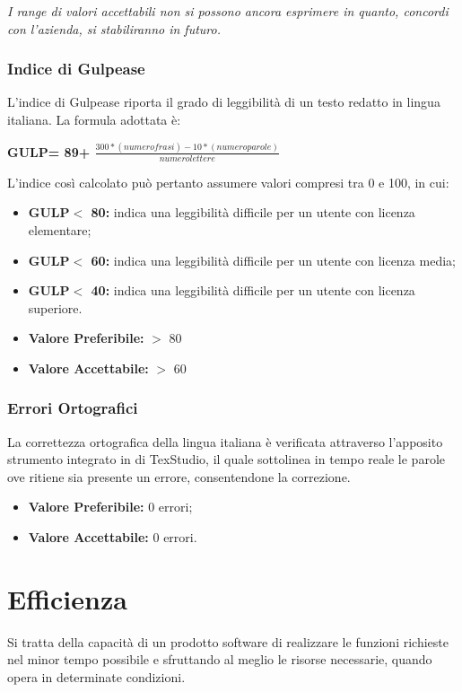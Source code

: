 \textit{I range di valori accettabili non si possono ancora esprimere in quanto, concordi con l'azienda, si stabiliranno in futuro.}
\subsubsection{Indice di Gulpease} \label{3.3.1.2}
L’indice di Gulpease riporta il grado di leggibilità di un testo redatto in lingua italiana.
La formula adottata è:
\begin{center}
	\textbf{GULP= 89+ $\frac{300*(numero frasi)-10*(numero parole)}{numero lettere}$}
\end{center}
L'indice così calcolato può pertanto assumere valori compresi tra 0 e 100, in cui:
\begin{itemize}
	\item \textbf{GULP$<$ 80:} indica una leggibilità difficile per un utente con licenza elementare;
	\item \textbf{GULP$<$ 60:} indica una leggibilità difficile per un utente con licenza media;
	\item \textbf{GULP$<$ 40:} indica una leggibilità difficile per un utente con licenza superiore.
\end{itemize}
\begin{itemize}
	\item \textbf{Valore Preferibile:} $>$ 80 
	\item \textbf{Valore  Accettabile:} $>$ 60
\end{itemize}
\subsubsection{Errori Ortografici} \label{3.3.1.3}
La correttezza ortografica della lingua italiana è verificata attraverso l’apposito strumento integrato in di TexStudio, il quale sottolinea in tempo reale le parole ove ritiene sia presente un errore, consentendone la correzione.
\begin{itemize}
	\item \textbf{Valore Preferibile:} 0 errori;
	\item \textbf{Valore  Accettabile:} 0 errori.
\end{itemize}

\section{Efficienza} \label{3.4}
Si tratta della capacità di un prodotto software di realizzare le funzioni richieste nel minor tempo possibile e sfruttando al meglio le risorse necessarie, quando opera in determinate condizioni. 

